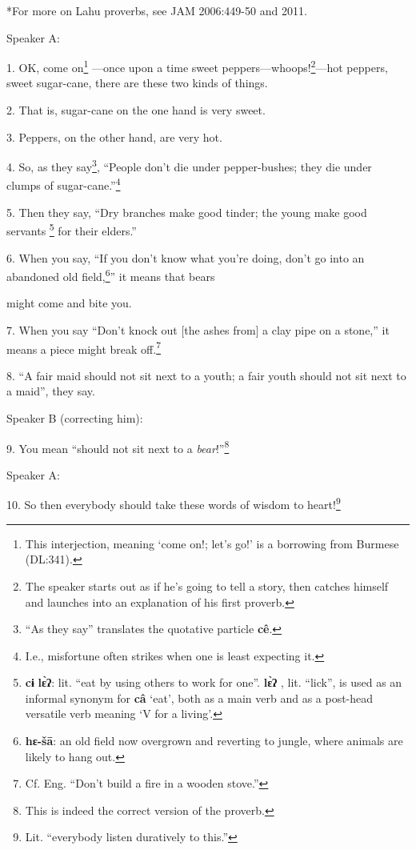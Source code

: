 \setcounter{footnote}{0}

*For more on Lahu proverbs, see JAM 2006:449-50 and 2011.

Speaker A:

1. OK, come on\footnote{This interjection, meaning `come on!; let's go!' is a borrowing from Burmese (DL:341).} ---once upon a time sweet peppers---whoops!\footnote{The speaker starts out as if he's going to tell a story, then catches himself and launches into an explanation of his first proverb.}---hot peppers,
sweet sugar-cane, there are these two kinds of things.

2. That is, sugar-cane on the one hand is very sweet.

3. Peppers, on the other hand, are very hot.

4. So, as they say\footnote{``As they say'' translates the quotative particle \textbf{cê}.}, ``People don't die under pepper-bushes; they die under
clumps of sugar-cane.''\footnote{I.e., misfortune often strikes when one is least expecting it.}

5. Then they say, ``Dry branches make good tinder; the young make good servants
\footnote{\textbf{cɨ} \textbf{lɛ̀ʔ}: lit. ``eat by using others to work for one''. \textbf{lɛ̀ʔ} , lit. ``lick'', is used as an informal synonym for \textbf{câ} `eat', both as a main verb and as a post-head versatile verb meaning `V for a living'.} for their elders.''

6. When you say, ``If you don't know what you're doing, don't go into an abandoned
old field,\footnote{\textbf{hɛ-šā}: an old field now overgrown and reverting to jungle, where animals are likely to hang out.}'' it means that bears

might come and bite you.

7. When you say ``Don't knock out [the ashes from] a clay pipe on a stone,'' it
means a piece might break off.\footnote{Cf. Eng. ``Don't build a fire in a wooden stove.''}

8. ``A fair maid should not sit next to a youth; a fair youth should not sit next
to a maid'', they say.

Speaker B (correcting him):

9. You mean ``should not sit next to a \textit{bear}!''\footnote{This is indeed the correct version of the proverb.}

Speaker A:

10. So then everybody should take these words of wisdom to heart!\footnote{Lit. ``everybody listen duratively to this.''}

